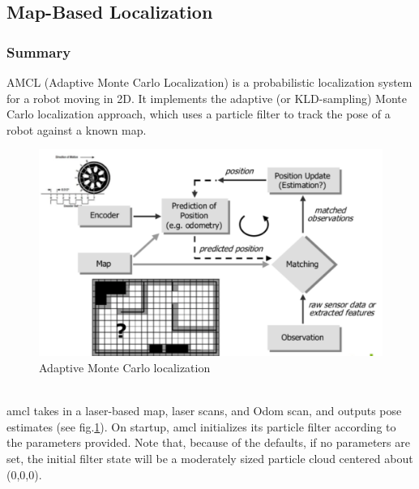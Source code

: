 \subsection{Map-Based Localization\cite{mbl}} %
\subsubsection*{Summary}
AMCL (Adaptive Monte Carlo Localization) is a probabilistic localization system for a robot moving in 2D. It implements the adaptive (or KLD-sampling) Monte Carlo localization\cite{acml1}\cite{acml2} approach, which uses a particle filter to track the pose of a robot against a known map.
\begin{figure}[!htbp]
	\centering
	\includegraphics[width = 15cm]{Pictures/amcl}
	\caption{Adaptive Monte Carlo localization}
	\label{amcl}
\end{figure}\\
amcl takes in a laser-based map, laser scans, and Odom scan, and outputs pose estimates (see fig.\ref{amcl}). On startup, amcl initializes its particle filter according to the parameters provided. Note that, because of the defaults, if no parameters are set, the initial filter state will be a moderately sized particle cloud centered about (0,0,0).
\\
